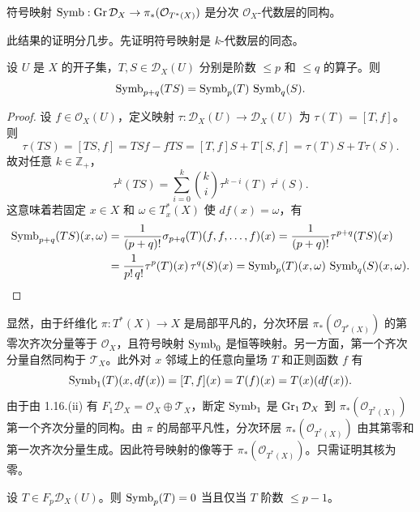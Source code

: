 \begin{theorem}
符号映射 $\operatorname{Symb}:\operatorname{Gr}\mathcal{D}_X\to\pi_*(\mathcal{O}_{T^*(X)})$ 是分次 $\mathcal{O}_X$-代数层的同构。
\end{theorem}

此结果的证明分几步。先证明符号映射是 $k$-代数层的同态。

\begin{lemma}
设 $U$ 是 $X$ 的开子集，$T,S\in\mathcal{D}_X(U)$ 分别是阶数 $\le p$ 和 $\le q$ 的算子。则
$$\operatorname{Symb}_{p+q}(TS)=\operatorname{Symb}_p(T)\,\operatorname{Symb}_q(S).$$
\end{lemma}

\begin{proof}
设 $f\in\mathcal{O}_X(U)$，定义映射 $\tau:\mathcal{D}_X(U)\to\mathcal{D}_X(U)$ 为 $\tau(T)=[T,f]$。则
$$\tau(TS)=[TS,f]=TSf-fTS=[T,f]S+T[S,f]=\tau(T)S+T\tau(S).$$
故对任意 $k\in\mathbb{Z}_+$，
$$\tau^k(TS)=\sum_{i=0}^k\binom{k}{i}\tau^{k-i}(T)\,\tau^i(S).$$
这意味着若固定 $x\in X$ 和 $\omega\in T^*_x(X)$ 使 $df(x)=\omega$，有
\begin{align*}
\operatorname{Symb}_{p+q}(TS)(x,\omega)&=\frac{1}{(p+q)!}\sigma_{p+q}(T)(f,f,\dots,f)(x)=\frac{1}{(p+q)!}\tau^{p+q}(TS)(x)\\
&=\frac{1}{p!\,q!}\tau^p(T)(x)\,\tau^q(S)(x)=\operatorname{Symb}_p(T)(x,\omega)\,\operatorname{Symb}_q(S)(x,\omega).
\end{align*}
\end{proof}

显然，由于纤维化 $\pi:T^*(X)\to X$ 是局部平凡的，分次环层 $\pi_*(\mathcal{O}_{T^*(X)})$ 的第零次齐次分量等于 $\mathcal{O}_X$，且符号映射 $\operatorname{Symb}_0$ 是恒等映射。另一方面，第一个齐次分量自然同构于 $\mathcal{T}_X$。此外对 $x$ 邻域上的任意向量场 $T$ 和正则函数 $f$ 有
$$\operatorname{Symb}_1(T)(x,df(x))=[T,f](x)=T(f)(x)=T(x)(df(x)).$$
由于由 1.16.(ii) 有 $F_1\mathcal{D}_X=\mathcal{O}_X\oplus\mathcal{T}_X$，断定 $\operatorname{Symb}_1$ 是 $\operatorname{Gr}_1\mathcal{D}_X$ 到 $\pi_*(\mathcal{O}_{T^*(X)})$ 第一个齐次分量的同构。由 $\pi$ 的局部平凡性，分次环层 $\pi_*(\mathcal{O}_{T^*(X)})$ 由其第零和第一次齐次分量生成。因此符号映射的像等于 $\pi_*(\mathcal{O}_{T^*(X)})$。只需证明其核为零。

\begin{lemma}
设 $T\in F_p\mathcal{D}_X(U)$。则 $\operatorname{Symb}_p(T)=0$ 当且仅当 $T$ 阶数 $\le p-1$。
\end{lemma}

